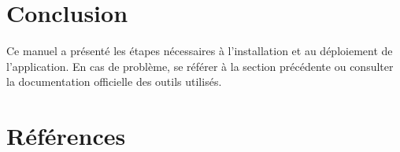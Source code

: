\documentclass[12pt, a4paper]{article}
\begin{document}
\section{Conclusion}

Ce manuel a présenté les étapes nécessaires à l'installation et au déploiement
de l'application. En cas de problème, se référer à la section précédente ou
consulter la documentation officielle des outils utilisés.

\section{Références}

\printbibliography[heading=none]
\end{document}
